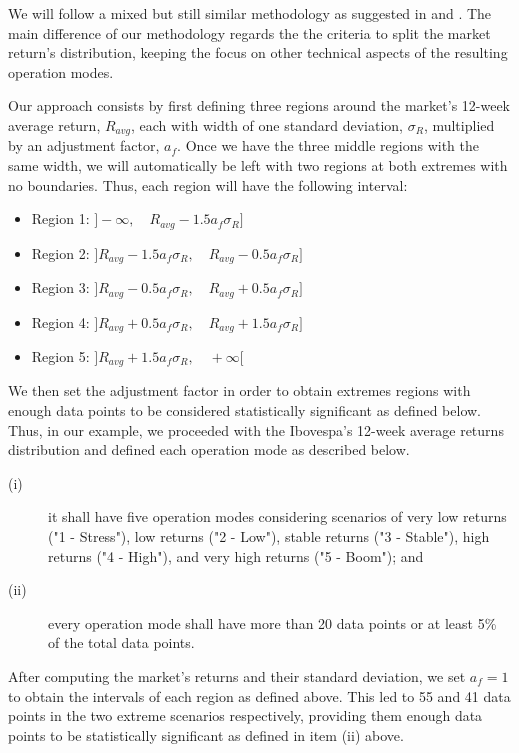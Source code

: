 We will follow a mixed but still similar methodology as suggested in \cite{doe0000} and \cite{doe0000}. The main difference of our methodology regards the the criteria to split the market return's distribution, keeping the focus on other technical aspects of the resulting operation modes.

Our approach consists by first defining three regions around the market's 12-week average return, $R_{avg}$, each with width of one standard deviation, $\sigma_R$, multiplied by an adjustment factor, $a_f$. Once we have the three middle regions with the same width, we will automatically be left with two regions at both extremes with no boundaries. Thus, each region will have the following interval:
%
\begin{itemize}
    \item Region 1: $]-\infty ,\quad R_{avg} - 1.5 a_f \sigma_R]$
    \item Region 2: $]R_{avg} - 1.5 a_f \sigma_R ,\quad R_{avg} - 0.5 a_f \sigma_R]$
    \item Region 3: $]R_{avg} - 0.5 a_f \sigma_R ,\quad R_{avg} + 0.5 a_f \sigma_R]$
    \item Region 4: $]R_{avg} + 0.5 a_f \sigma_R ,\quad R_{avg} + 1.5 a_f \sigma_R]$
    \item Region 5: $]R_{avg} + 1.5 a_f \sigma_R ,\quad +\infty[$
\end{itemize}

We then set the adjustment factor in order to obtain extremes regions with enough data points to be considered statistically significant as defined below. Thus, in our example, we proceeded with the Ibovespa's 12-week average returns distribution and defined each operation mode as described below.
%
\begin{description}
    \item[(i)] it shall have five operation modes considering scenarios of very low returns ("1 - Stress"), low returns ("2 - Low"), stable returns ("3 - Stable"), high returns ("4 - High"), and very high returns ("5 - Boom"); and
    \item[(ii)] every operation mode shall have more than 20 data points or at least 5\% of the total data points.
\end{description}

After computing the market's returns and their standard deviation, we set $a_f=1$ to obtain the intervals of each region as defined above. This led to 55 and 41 data points in the two extreme scenarios respectively, providing them enough data points to be statistically significant as defined in item (ii) above.


